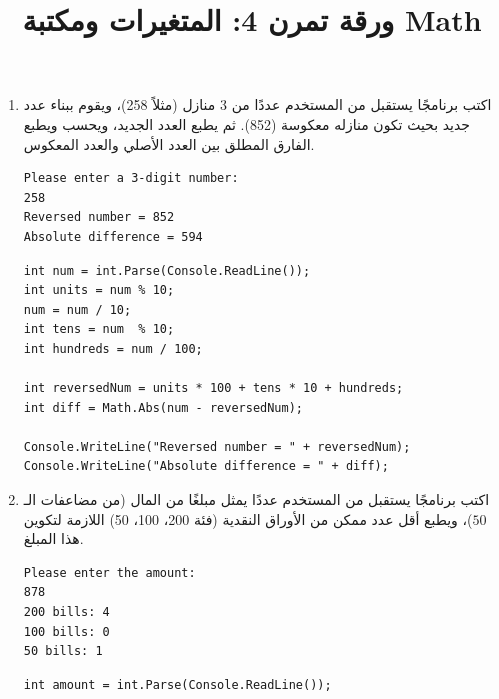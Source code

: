 \documentclass[14pt]{extarticle}
\title{ورقة تمرن 4: المتغيرات ومكتبة \textenglish{Math}}
\begin{document}
\maketitle
\thispagestyle{fancy}

\begin{enumerate}[itemsep=3em]

    \item
    اكتب برنامجًا يستقبل من المستخدم عددًا من 3 منازل (مثلاً 258)، ويقوم ببناء عدد جديد بحيث تكون منازله معكوسة (852). ثم يطبع العدد الجديد، ويحسب ويطبع الفارق المطلق بين العدد الأصلي والعدد المعكوس.
    \ifdetailed
    \begin{boxExample}
    \begin{english}
    \begin{verbatim}
Please enter a 3-digit number:
258
Reversed number = 852
Absolute difference = 594
    \end{verbatim}
    \end{english}
    \end{boxExample}
    \ifwithsols
    \begin{boxSolution}
    \begin{english}
    \begin{verbatim}
int num = int.Parse(Console.ReadLine());
int units = num % 10;
num = num / 10;
int tens = num  % 10;
int hundreds = num / 100;

int reversedNum = units * 100 + tens * 10 + hundreds;
int diff = Math.Abs(num - reversedNum);

Console.WriteLine("Reversed number = " + reversedNum);
Console.WriteLine("Absolute difference = " + diff);
    \end{verbatim}
    \end{english}
    \end{boxSolution}
    \clearpage
    \fi
    \fi

    \ifwhiteblack
    \clearpage
    \fi

    \item
    اكتب برنامجًا يستقبل من المستخدم عددًا يمثل مبلغًا من المال (من مضاعفات الـ $50$)، ويطبع أقل عدد ممكن من الأوراق النقدية (فئة 200، 100، 50) اللازمة لتكوين هذا المبلغ.
    \ifdetailed
    \begin{boxExample}
    \begin{english}
    \begin{verbatim}
Please enter the amount:
878
200 bills: 4
100 bills: 0
50 bills: 1
    \end{verbatim}
    \end{english}
    \end{boxExample}
    \ifwithsols
    \begin{boxSolution}
    \begin{english}
    \begin{verbatim}
int amount = int.Parse(Console.ReadLine());


\end{verbatim}
\end{english}
\end{boxSolution}
\end{enumerate}
\end{document}
